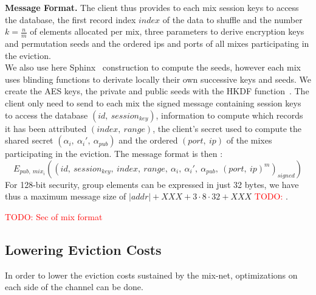 \documentclass{llncs}
\newcommand{\todo}[1]{\textcolor{red}{TODO: #1}}
\begin{document}
\noindent\textbf{Message Format.}
The client thus provides to each mix session keys to access the database, the first record index $index$ of the data to shuffle and the number $k=\frac{n}{m}$ of elements allocated per mix, three parameters to derive encryption keys and permutation seeds and the ordered ips and ports of all mixes participating in the eviction.\\
We also use here Sphinx~\cite{XXXsphinx} construction to compute the seeds, however each mix uses blinding functions to derivate locally their own successive keys and seeds. \iffalse\\
Let $\kappa$ be the security parameter. We call $\mathcal{G}$ a prime order cyclic group satisfying the Decisional Diffie-Hellman Assumption. $\mathcal{G}^*$ is the set of non-identity elements of $\mathcal{G}$. The element $g$ is a generator of the group, and $q$ is the prime order of $\mathcal{G}$ with $q \approx 2^{2\kappa}$.\\
We suppose each mix owns a pair of keys ($\ priv_i \in \mathbb{Z}_{q}^*$, $pub_i=g^{priv_i}\in \mathcal{G}^*$). We assume the existence of a PKI that publishes a list of all ($mix_i$,\ $pub_i$) pair.
The client randomly chooses $x\in_\mathcal{R} \mathbb{Z}_q^*$ and sends to the mix $mix_i$ the element $\alpha_i=g^{x\cdot b_i}$ with $b_i$ a binding factors, the shared secret is then $s_i=pub_i^{x\cdot b_i}$.
\fi
We create the AES keys, the private and public seeds with the HKDF function~\cite{XXXHKDF}. The client only need to send to each mix the signed message containing session keys to access the database $(id,\ session_{key})$, information to compute which records it has been attributed $(index,\ range)$, the client's secret used to compute the shared secret $(\alpha_i,\ \alpha_i',\ \alpha_{pub})$ and the ordered $(port,\ ip)$ of the mixes participating in the eviction.
The message format is then : $$E_{pub,\ mix_i}\left (\left(id,\ session_{key},\ index,\ range,\ \alpha_i,\ \alpha_i',\ \alpha_{pub},\ (port,\ ip)^m \right )_{signed}\right )$$ For 128-bit security, group elements can be expressed in just 32 bytes, we have thus a maximum message size of $|addr|+XXX + 3 \cdot 8 \cdot 32 + XXX$ \todo{}. 

\todo{Sec of mix format}


\subsection{Lowering Eviction Costs}

In order to lower the eviction costs sustained by the mix-net, optimizations on each side of the channel can be done.
\end{document}
